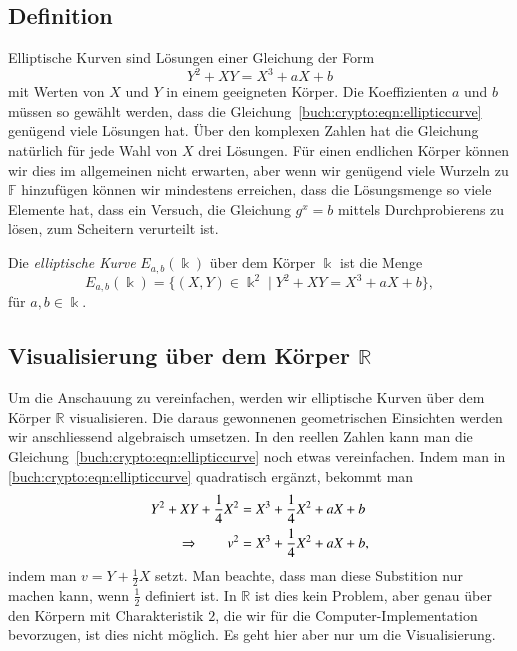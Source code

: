 \subsection{Definition}
Elliptische Kurven sind Lösungen einer Gleichung der Form
\begin{equation}
Y^2+XY=X^3+aX+b
\label{buch:crypto:eqn:ellipticcurve}
\end{equation}
mit Werten von $X$ und $Y$ in einem geeigneten Körper.
Die Koeffizienten $a$ und $b$ müssen so gewählt werden, dass die
Gleichung~\eqref{buch:crypto:eqn:ellipticcurve} genügend viele
Lösungen hat.
Über den komplexen Zahlen hat die Gleichung natürlich für jede Wahl von
$X$ drei Lösungen.
Für einen endlichen Körper können wir dies im allgemeinen nicht erwarten,
aber wenn wir genügend viele Wurzeln zu $\mathbb{F}$ hinzufügen können wir
mindestens erreichen, dass die Lösungsmenge so viele Elemente hat, 
dass ein Versuch, die Gleichung $g^x=b$ mittels Durchprobierens zu
lösen, zum Scheitern verurteilt ist.

\begin{definition}
\label{buch:crypto:def:ellipticcurve}
Die {\em elliptische Kurve} $E_{a,b}(\Bbbk)$ über dem Körper $\Bbbk$ ist 
%
die Menge
\[
E_{a,b}(\Bbbk)
=
\{(X,Y)\in\Bbbk^2 \mid Y^2+XY=X^3+aX+b\},
\]
für $a,b\in\Bbbk$.
\end{definition}

\subsection{Visualisierung über dem Körper $\mathbb{R}$}
Um die Anschauung zu vereinfachen, werden wir elliptische Kurven über
dem Körper $\mathbb{R}$ visualisieren.
Die daraus gewonnenen geometrischen Einsichten werden wir anschliessend
algebraisch umsetzen.
In den reellen Zahlen kann man die
Gleichung~\eqref{buch:crypto:eqn:ellipticcurve}
noch etwas vereinfachen.
Indem man in \eqref{buch:crypto:eqn:ellipticcurve} 
quadratisch ergänzt, bekommt man
\begin{align}
Y^2 + XY + \frac14X^2 &= X^3+\frac14 X^2 +aX+b
\notag
\\
\Rightarrow\qquad
v^2&=X^3+\frac14X^2+aX+b,
\label{buch:crypto:eqn:ell2}
\end{align}
indem man $v=Y+\frac12X$ setzt.
Man beachte, dass man diese Substition nur machen kann, wenn $\frac12$
definiert ist.
In $\mathbb{R}$ ist dies kein Problem, aber genau über den Körpern
mit Charakteristik $2$, die wir für die Computer-Implementation
bevorzugen, ist dies nicht möglich.
Es geht hier aber nur um die Visualisierung.

